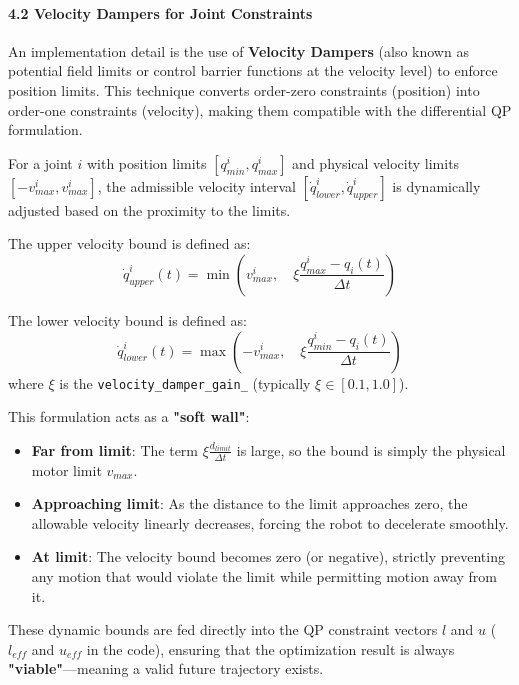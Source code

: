 \documentclass[12pt,a4paper]{report}
\begin{document}
\paragraph{4.2 Velocity Dampers for Joint Constraints}
An implementation detail is the use of \textbf{Velocity Dampers} (also known as potential field limits or control barrier functions at the velocity level) to enforce position limits. This technique converts order-zero constraints (position) into order-one constraints (velocity), making them compatible with the differential QP formulation.

For a joint $i$ with position limits $[q_{min}^i, q_{max}^i]$ and physical velocity limits $[-v_{max}^i, v_{max}^i]$, the admissible velocity interval $[\dot{q}_{lower}^i, \dot{q}_{upper}^i]$ is dynamically adjusted based on the proximity to the limits.

The upper velocity bound is defined as:
\begin{equation}
    \dot{q}_{upper}^i(t) = \min \left( v_{max}^i, \quad \xi \frac{q_{max}^i - q_i(t)}{\Delta t} \right)
\end{equation}

The lower velocity bound is defined as:
\begin{equation}
    \dot{q}_{lower}^i(t) = \max \left( -v_{max}^i, \quad \xi \frac{q_{min}^i - q_i(t)}{\Delta t} \right)
\end{equation}
where $\xi$ is the \texttt{velocity\_damper\_gain\_} (typically $\xi \in [0.1, 1.0]$).

This formulation acts as a \textbf{"soft wall"}:
\begin{itemize}
    \item \textbf{Far from limit}: The term $\xi \frac{d_{limit}}{\Delta t}$ is large, so the bound is simply the physical motor limit $v_{max}$.
    \item \textbf{Approaching limit}: As the distance to the limit approaches zero, the allowable velocity linearly decreases, forcing the robot to decelerate smoothly.
    \item \textbf{At limit}: The velocity bound becomes zero (or negative), strictly preventing any motion that would violate the limit while permitting motion away from it.
\end{itemize}

These dynamic bounds are fed directly into the QP constraint vectors $l$ and $u$ ($l_{eff}$ and $u_{eff}$ in the code), ensuring that the optimization result is always \textbf{"viable"}---meaning a valid future trajectory exists.
\end{document}
